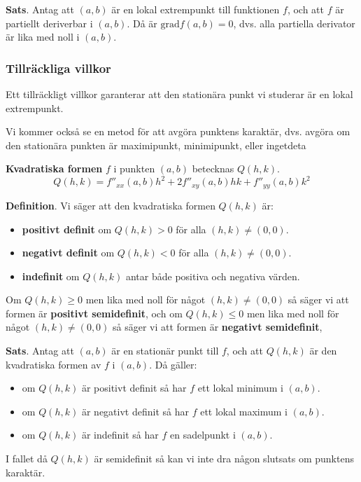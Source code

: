 \documentclass[a4paper,12pt]{article}
\begin{document}
\textbf{Sats}. Antag att $(a, b)$ är en lokal extrempunkt till funktionen $f$, och att $f$ är partiellt deriverbar i $(a, b)$. Då är $\text{grad} f(a, b) = 0$, dvs. alla partiella derivator är lika med noll i $(a, b)$.

\subsubsection*{Tillräckliga villkor}
Ett tillräckligt villkor garanterar att den stationära punkt vi studerar är en lokal extrempunkt.

Vi kommer också se en metod för att avgöra punktens karaktär, dvs. avgöra om den stationära punkten är maximipunkt, minimipunkt, eller ingetdeta

\textbf{Kvadratiska formen} $f$ i punkten $(a, b)$ betecknas $Q(h, k)$.
\[
    Q(h, k) = f''_{xx}(a, b)h^2 + 2f''_{xy}(a, b)hk + f''_{yy}(a, b)k^2
\]

\textbf{Definition}.
Vi säger att den kvadratiska formen $Q(h, k)$ är:
\begin{itemize}
    \item[] \textbf{positivt definit} om $Q(h, k) > 0$ för alla $(h, k) \neq (0, 0)$.
    \item[] \textbf{negativt definit} om $Q(h, k) < 0$ för alla $(h, k) \neq (0, 0)$.
    \item[] \textbf{indefinit} om $Q(h, k)$ antar både positiva och negativa värden.
\end{itemize}
Om $Q(h, k) \geq 0$ men lika med noll för något $(h, k) \neq (0, 0)$ så säger vi att formen är \textbf{positivt semidefinit},
och om $Q(h, k) \leq 0$ men lika med noll för något $(h, k) \neq (0, 0)$ så säger vi att formen är \textbf{negativt semidefinit},

\textbf{Sats}. Antag att $(a, b)$ är en stationär punkt till $f$, och att $Q(h, k)$ är den kvadratiska formen av $f$ i $(a, b)$. Då gäller:
\begin{itemize}
    \item[] om $Q(h, k)$ är positivt definit så har $f$ ett lokal minimum i $(a, b)$.
    \item[] om $Q(h, k)$ är negativt definit så har $f$ ett lokal maximum i $(a, b)$.
    \item[] om $Q(h, k)$ är indefinit så har $f$ en sadelpunkt i $(a, b)$.
\end{itemize}

I fallet då $Q(h, k)$ är semidefinit så kan vi inte dra någon slutsats om punktens karaktär.
\end{document}
